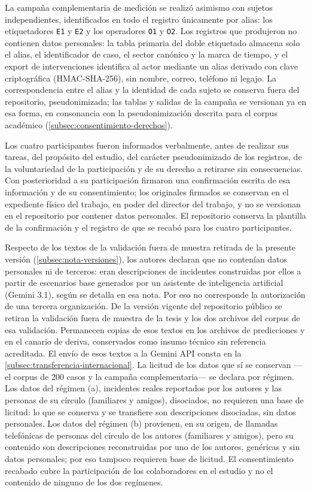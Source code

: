 La campaña complementaria de medición se realizó asimismo con sujetos independientes, identificados en todo el registro únicamente por alias: los etiquetadores \texttt{E1} y \texttt{E2} y los operadores \texttt{O1} y \texttt{O2}. Los registros que produjeron no contienen datos personales: la tabla primaria del doble etiquetado almacena solo el alias, el identificador de caso, el sector canónico y la marca de tiempo, y el export de intervenciones identifica al actor mediante un alias derivado con clave criptográfica (HMAC-SHA-256), sin nombre, correo, teléfono ni legajo. La correspondencia entre el alias y la identidad de cada sujeto se conserva fuera del repositorio, pseudonimizada; las tablas y salidas de la campaña se versionan ya en esa forma, en consonancia con la pseudonimización descrita para el corpus académico (\autoref{subsec:consentimiento-derechos}).

Los cuatro participantes fueron informados verbalmente, antes de realizar sus tareas, del propósito del estudio, del carácter pseudonimizado de los registros, de la voluntariedad de la participación y de su derecho a retirarse sin consecuencias. Con posterioridad a su participación firmaron una confirmación escrita de esa información y de su consentimiento; los originales firmados se conservan en el expediente físico del trabajo, en poder del director del trabajo, y no se versionan en el repositorio por contener datos personales. El repositorio conserva la plantilla de la confirmación y el registro de que se recabó para los cuatro participantes.

Respecto de los textos de la validación fuera de muestra retirada de la presente versión (\autoref{subsec:nota-versiones}), los autores declaran que no contenían datos personales ni de terceros: eran descripciones de incidentes construidas por ellos a partir de escenarios base generados por un asistente de inteligencia artificial (Gemini 3.1), según se detalla en esa nota. Por eso no corresponde la autorización de una tercera organización. De la versión vigente del repositorio público se retiran la validación fuera de muestra de la tesis y los dos archivos del corpus de esa validación. Permanecen copias de esos textos en los archivos de predicciones y en el canario de deriva, conservados como insumo técnico sin referencia acreditada. El envío de esos textos a la Gemini API consta en la \autoref{subsec:transferencia-internacional}. La licitud de los datos que sí se conservan ---el corpus de 200 casos y la campaña complementaria--- se declara por régimen. Los datos del régimen (a), incidentes reales reportados por los autores y las personas de su círculo (familiares y amigos), disociados, no requieren una base de licitud: lo que se conserva y se transfiere son descripciones disociadas, sin datos personales. Los datos del régimen (b) provienen, en su origen, de llamadas telefónicas de personas del círculo de los autores (familiares y amigos), pero su contenido son descripciones reconstruidas por uno de los autores, genéricas y sin datos personales; por eso tampoco requieren base de licitud. El consentimiento recabado cubre la participación de los colaboradores en el estudio y no el contenido de ninguno de los dos regímenes.


